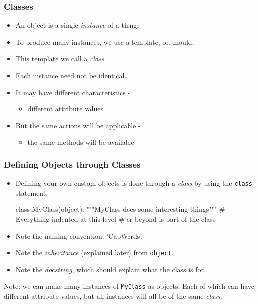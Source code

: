 \documentclass{beamer}
\begin{document}
\begin{frame}[fragile]
\frametitle{Classes}
\begin{itemize}
\item An object is a single \emph{instance} of a thing.
\item To produce many instances, we use a template, or, mould.
\item This template we call a \emph{class}.
\pause
\item Each instance need not be identical.
\item It may have different characteristics - 
\begin{itemize}
\item different attribute values
\end{itemize}
\pause
\item But the same actions will be applicable -
\begin{itemize}
\item the same methods will be available
\end{itemize}
\end{itemize}
\end{frame}

\begin{frame}[fragile]
\frametitle{Defining Objects through Classes}
\begin{itemize}
\item Defining your own custom objects is done through a \emph{class}
by using the \lstinline|class| statement.
\begin{code}
class MyClass(object):
  """MyClass does some interesting things"""
  # Everything indented at this level 
  # or beyond is part of the class
\end{code}
\item Note the naming convention: 'CapWords'.
\item Note the \emph{inheritance} (explained later) from \lstinline|object|.
\item Note the \emph{docstring}, which should explain what the class is for.
\end{itemize}
\pause
Note: we can make many instances of \lstinline|MyClass| as objects. 
Each of which can have different attribute values,
but all instances will all be of the same \emph{class}.

\end{frame}
\end{document}
